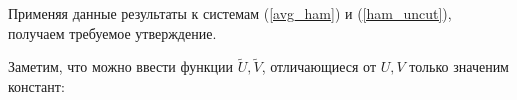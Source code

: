 \begin{enumerate}
Применяя данные результаты к системам (\ref{avg_ham}) и (\ref{ham_uncut}), получаем требуемое утверждение.



\end{enumerate}



Заметим, что можно ввести функции $\tilde U, \tilde V$, отличающиеся от $U, V$ только значеним констант:

